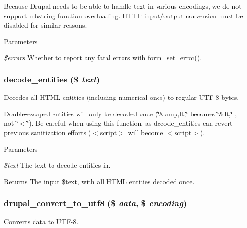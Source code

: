 Because Drupal needs to be able to handle text in various encodings, we do not support mbstring function overloading. HTTP input/output conversion must be disabled for similar reasons.


\begin{DoxyParams}{Parameters}
\item[{\em \$errors}]Whether to report any fatal errors with \hyperlink{group__form__api_ga6f4ecbec42e905390e521b393417f97f}{form\_\-set\_\-error()}. \end{DoxyParams}
\hypertarget{unicode_8inc_ac16f5ce77c68cec0acc3d0e193e5229c}{
\subsubsection[{decode\_\-entities}]{\setlength{\rightskip}{0pt plus 5cm}decode\_\-entities (\$ {\em text})}}
\label{unicode_8inc_ac16f5ce77c68cec0acc3d0e193e5229c}
Decodes all HTML entities (including numerical ones) to regular UTF-\/8 bytes.

Double-\/escaped entities will only be decoded once (\char`\"{}\&amp;lt;\char`\"{} becomes \char`\"{}\&lt;\char`\"{} , not \char`\"{}$<$\char`\"{}). Be careful when using this function, as decode\_\-entities can revert previous sanitization efforts ($<$script$>$ will become $<$script$>$).


\begin{DoxyParams}{Parameters}
\item[{\em \$text}]The text to decode entities in.\end{DoxyParams}
\begin{DoxyReturn}{Returns}
The input \$text, with all HTML entities decoded once. 
\end{DoxyReturn}
\hypertarget{unicode_8inc_a1e6d4fad793d53424ed9c4244953337e}{
\subsubsection[{drupal\_\-convert\_\-to\_\-utf8}]{\setlength{\rightskip}{0pt plus 5cm}drupal\_\-convert\_\-to\_\-utf8 (\$ {\em data}, \/  \$ {\em encoding})}}
\label{unicode_8inc_a1e6d4fad793d53424ed9c4244953337e}
Converts data to UTF-\/8.

